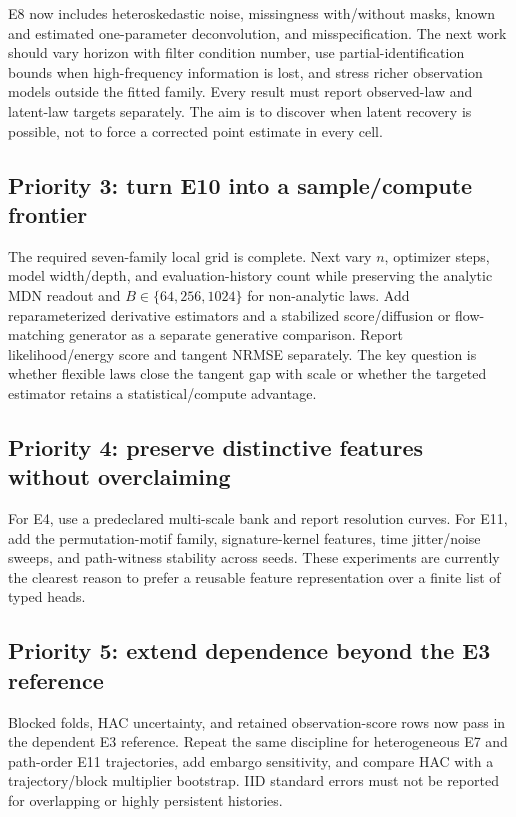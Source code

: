 \documentclass[11pt]{article}
\begin{document}
E8 now includes heteroskedastic noise, missingness with/without masks, known and estimated one-parameter deconvolution, and misspecification.  The next work should vary horizon with filter condition number, use partial-identification bounds when high-frequency information is lost, and stress richer observation models outside the fitted family.  Every result must report observed-law and latent-law targets separately.  The aim is to discover when latent recovery is possible, not to force a corrected point estimate in every cell.

\subsection*{Priority 3: turn E10 into a sample/compute frontier}

The required seven-family local grid is complete.  Next vary $n$, optimizer steps, model width/depth, and evaluation-history count while preserving the analytic MDN readout and $B\in\{64,256,1024\}$ for non-analytic laws.  Add reparameterized derivative estimators and a stabilized score/diffusion or flow-matching generator as a separate generative comparison.  Report likelihood/energy score and tangent NRMSE separately.  The key question is whether flexible laws close the tangent gap with scale or whether the targeted estimator retains a statistical/compute advantage.

\subsection*{Priority 4: preserve distinctive features without overclaiming}

For E4, use a predeclared multi-scale bank and report resolution curves.  For E11, add the permutation-motif family, signature-kernel features, time jitter/noise sweeps, and path-witness stability across seeds.  These experiments are currently the clearest reason to prefer a reusable feature representation over a finite list of typed heads.

\subsection*{Priority 5: extend dependence beyond the E3 reference}

Blocked folds, HAC uncertainty, and retained observation-score rows now pass in the dependent E3 reference.  Repeat the same discipline for heterogeneous E7 and path-order E11 trajectories, add embargo sensitivity, and compare HAC with a trajectory/block multiplier bootstrap.  IID standard errors must not be reported for overlapping or highly persistent histories.
\end{document}

